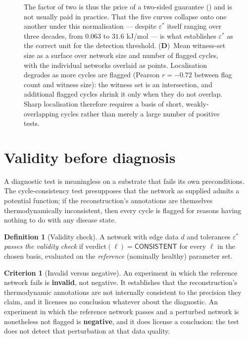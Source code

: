 \documentclass[11pt,twocolumn,a4paper]{article}
\theoremstyle{pstyle}
\theoremstyle{definition}
\newtheorem{definition}[theorem]{Definition}
\newtheorem{criterion}[theorem]{Criterion}
\theoremstyle{remark}
\newcommand{\eps}{\varepsilon}
\newcommand{\epsstar}{\eps^{\ast}}
\begin{document}
\begin{figure}[!htbp]
{    The factor of two is thus the price of a two-sided guarantee
    () and is not usually paid in practice.
    That the five curves collapse onto one another under this
    normalisation --- despite $\epsstar$ itself ranging over three
    decades, from $0.063$ to $31.6$ kJ/mol --- is what establishes
    $\epsstar$ as the correct unit for the detection threshold.
    (\textbf{D})~Mean witness-set size as a surface over network size
    and number of flagged cycles, with the individual networks
    overlaid as points.
    Localisation degrades as more cycles are flagged (Pearson
    $r = -0.72$ between flag count and witness size): the witness set is
    an intersection, and additional flagged cycles shrink it only when
    they do not overlap.
    Sharp localisation therefore requires a basis of short,
    weakly-overlapping cycles rather than merely a large number of
    positive tests.}
    \label{fig:tol_panel4}
\end{figure}

\section{Validity before diagnosis}
\label{sec:validity}

A diagnostic test is meaningless on a substrate that fails its own
preconditions. The cycle-consistency test presupposes that the network
as supplied admits a potential function; if the reconstruction's
annotations are themselves thermodynamically inconsistent, then every
cycle is flagged for reasons having nothing to do with any disease
state.

\begin{definition}[Validity check]
\label{def:validity}
A network with edge data $d$ and tolerances $\epsstar$ \emph{passes the
validity check} if
$\mathrm{verdict}(\ell)=\textsf{CONSISTENT}$ for every $\ell$ in the
chosen basis, evaluated on the \emph{reference} (nominally healthy)
parameter set.
\end{definition}

\begin{criterion}[Invalid versus negative]
\label{crit:invalid}
An experiment in which the reference network fails
 is \textbf{invalid}, not negative. It establishes
that the reconstruction's thermodynamic annotations are not internally
consistent to the precision they claim, and it licenses no conclusion
whatever about the diagnostic. An experiment in which the reference
network passes and a perturbed network is nonetheless not flagged is
\textbf{negative}, and it does license a conclusion: the test does not
detect that perturbation at that data quality.
\end{criterion}
\end{document}
